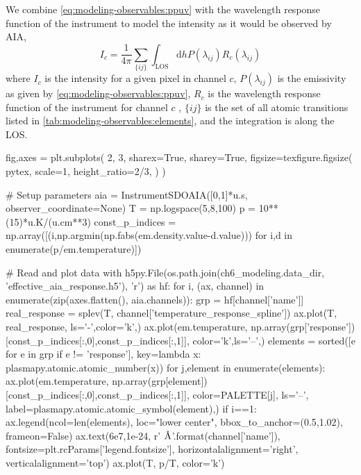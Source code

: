 We combine \autoref{eq:modeling-observables:ppuv} with the wavelength response function of the instrument to model the intensity as it would be observed by AIA,
\begin{equation}\label{eq:modeling-observables:intensity}
    I_c = \frac{1}{4\pi}\sum_{\{ij\}}\int_{\text{LOS}}\mathrm{d}hP(\lambda_{ij})R_c(\lambda_{ij})
\end{equation}
where $I_c$ is the intensity for a given pixel in channel $c$, $P(\lambda_{ij})$ is the emissivity as given by \autoref{eq:modeling-observables:ppuv}, $R_c$ is the wavelength response function of the instrument for channel $c$ \citep[see][]{boerner_initial_2012}, $\{ij\}$ is the set of all atomic transitions listed in \autoref{tab:modeling-observables:elements}, and the integration is along the LOS. 

\begin{pycode}
fig,axes = plt.subplots(
    2, 3, sharex=True, sharey=True,
    figsize=texfigure.figsize(
        pytex, 
        scale=1,
        height_ratio=2/3,       
    )
)

# Setup parameters
aia = InstrumentSDOAIA([0,1]*u.s, observer_coordinate=None)
T = np.logspace(5,8,100)
p = 10**(15)*u.K/(u.cm**3)
const_p_indices = np.array([(i,np.argmin(np.fabs(em.density.value-d.value))) 
                            for i,d in enumerate(p/em.temperature)])

# Read and plot data
with h5py.File(os.path.join(ch6_modeling.data_dir, 'effective_aia_response.h5'), 'r') as hf:
    for i, (ax, channel) in enumerate(zip(axes.flatten(), aia.channels)):
        grp = hf[channel['name']]
        real_response = splev(T, channel['temperature_response_spline'])
        ax.plot(T, real_response, ls='-',color='k',)
        ax.plot(em.temperature, 
                np.array(grp['response'])[const_p_indices[:,0],const_p_indices[:,1]],
                color='k',ls='--',)
        elements = sorted([e for e in grp if e != 'response'],
                            key=lambda x: plasmapy.atomic.atomic_number(x))
        for j,element in enumerate(elements):
            ax.plot(em.temperature, 
                    np.array(grp[element])[const_p_indices[:,0],const_p_indices[:,1]],
                    color=PALETTE[j], ls='--', label=plasmapy.atomic.atomic_symbol(element),)
        if i==1:
            ax.legend(ncol=len(elements), loc="lower center", bbox_to_anchor=(0.5,1.02),
                      frameon=False)
        ax.text(6e7,1e-24, r'{} $\si{{\angstrom}}$'.format(channel['name']),
                fontsize=plt.rcParams['legend.fontsize'],
                horizontalalignment='right', verticalalignment='top')
ax.plot(T, p/T, color='k')


\end{pycode}
